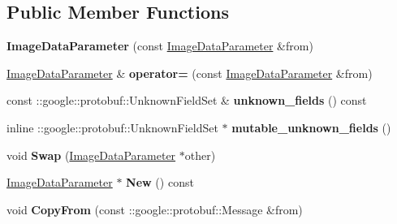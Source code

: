 \subsection*{Public Member Functions}
\begin{DoxyCompactItemize}
\item 
\mbox{\label{classcaffe_1_1_image_data_parameter_a0d0d44207ebf5f26f06ed529852d1ab4}} 
{\bfseries Image\+Data\+Parameter} (const \mbox{\hyperlink{classcaffe_1_1_image_data_parameter}{Image\+Data\+Parameter}} \&from)
\item 
\mbox{\label{classcaffe_1_1_image_data_parameter_a8bc4ec6ecc78d55236fd807a4f64ec8f}} 
\mbox{\hyperlink{classcaffe_1_1_image_data_parameter}{Image\+Data\+Parameter}} \& {\bfseries operator=} (const \mbox{\hyperlink{classcaffe_1_1_image_data_parameter}{Image\+Data\+Parameter}} \&from)
\item 
\mbox{\label{classcaffe_1_1_image_data_parameter_a65361ae895e7814a40da38af92997b5a}} 
const \+::google\+::protobuf\+::\+Unknown\+Field\+Set \& {\bfseries unknown\+\_\+fields} () const
\item 
\mbox{\label{classcaffe_1_1_image_data_parameter_a22dccf8b16a6e98ef6b0151887167f98}} 
inline \+::google\+::protobuf\+::\+Unknown\+Field\+Set $\ast$ {\bfseries mutable\+\_\+unknown\+\_\+fields} ()
\item 
\mbox{\label{classcaffe_1_1_image_data_parameter_ada878990e5fe86edc4c8b3c3393673ab}} 
void {\bfseries Swap} (\mbox{\hyperlink{classcaffe_1_1_image_data_parameter}{Image\+Data\+Parameter}} $\ast$other)
\item 
\mbox{\label{classcaffe_1_1_image_data_parameter_aeae57105b4bf994cca823e7f62db4d68}} 
\mbox{\hyperlink{classcaffe_1_1_image_data_parameter}{Image\+Data\+Parameter}} $\ast$ {\bfseries New} () const
\item 
\mbox{\label{classcaffe_1_1_image_data_parameter_a29e481f0c1818a3c14d451909b196f43}} 
void {\bfseries Copy\+From} (const \+::google\+::protobuf\+::\+Message \&from)

\end{DoxyCompactItemize}
